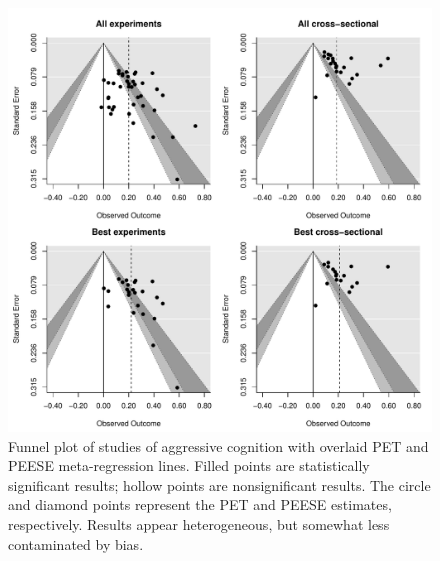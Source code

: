 \documentclass[man, mask]{apa6}
\begin{document}
\begin{figure}
	\includegraphics[width = \textwidth, keepaspectratio]{funnels-0_AggCog.pdf}
	\caption{Funnel plot of studies of aggressive cognition with overlaid PET and PEESE meta-regression lines. Filled points are statistically significant results; hollow points are nonsignificant results. The circle and diamond points represent the PET and PEESE estimates, respectively. Results appear heterogeneous, but somewhat less contaminated by bias.}
	\label{funnel-aggcog}
\end{figure}
\end{document}
